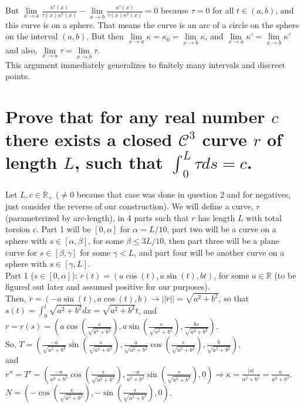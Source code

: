 \documentclass[12pt]{amsart}
\begin{document}
But $\lim\limits_{x\to a}\frac{\kappa'(x)}{\tau(x)\kappa^2(x)}-\lim\limits_{x\to b}\frac{\kappa'(x)}{\tau(x)\kappa^2(x)}=0$ because $\tau=0$ for all $t\in(a,b)$, and this curve is on a sphere. That means the curve is an arc of a circle on the sphere on the interval $(a,b)$. But then $\lim\limits_{x\to a}\kappa=\kappa_0=\lim\limits_{x\to b}\kappa$, and $\lim\limits_{x\to a}\kappa'=\lim\limits_{x\to b}\kappa'$ and also, $\lim\limits_{x\to a}\tau=\lim\limits_{x\to b}\tau$.
\\This argument immediately generalizes to finitely many intervals and discreet points.

\newpage
\section{Prove that for any real number $c$ there exists a closed $\mathcal{C}^3$ curve $r$ of length $L$, such that $\int_0^L\tau ds=c$.}
Let $L,c\in\mathbb{R}_+$ ($\neq0$ because that case was done in question 2 and for negatives, just consider the reverse of our construction). We will define a curve, $r$ (parameterized by arc-length), in 4 parts such that $r$ has length $L$ with total torsion $c$. Part 1 will be $[0,\alpha]$ for $\alpha=L/10$, part two will be a curve on a sphere with $s\in[\alpha,\beta]$, for some $\beta\leq 3L/10$, then part three will be a plane curve for $s\in[\beta,\gamma]$ for some $\gamma<L$, and part four will be another curve on a sphere with $s\in[\gamma,L]$.
\\Part 1 ($s\in[0,\alpha]$): $r(t)=(a\cos(t),a\sin(t),bt)$, for some $a\in\mathbb{R}$ (to be figured out later and assumed positive for our purposes).
\\Then, $\dot r=(-a\sin(t),a\cos(t),b)\rightarrow||\dot r||=\sqrt{a^2+b^2}$, so that $s(t)=\int_0^t\sqrt{a^2+b^2}dx=\sqrt{a^2+b^2}t$, and $r=r(s)=\left(a\cos\left(\frac{s}{\sqrt{a^2+b^2}}\right),a\sin\left(\frac{s}{\sqrt{a^2+b^2}}\right),\frac{bs}{\sqrt{a^2+b^2}}\right)$.
\\So, $T=\left(\frac{-a}{\sqrt{a^2+b^2}}\sin\left(\frac{s}{\sqrt{a^2+b^2}}\right),\frac{a}{\sqrt{a^2+b^2}}\cos\left(\frac{s}{\sqrt{a^2+b^2}}\right),\frac{b}{\sqrt{a^2+b^2}}\right)$,
\\and $r''=T'=\left(\frac{-a}{a^2+b^2}\cos\left(\frac{s}{\sqrt{a^2+b^2}}\right),\frac{-a}{a^2+b^2}\sin\left(\frac{s}{\sqrt{a^2+b^2}}\right),0\right)\Rightarrow\kappa=\frac{|a|}{a^2+b^2}=\frac{a}{a^2+b^2}$.
\\$N=\left(-\cos\left(\frac{s}{\sqrt{a^2+b^2}}\right),-\sin\left(\frac{s}{\sqrt{a^2+b^2}}\right),0\right)$.
\end{document}
